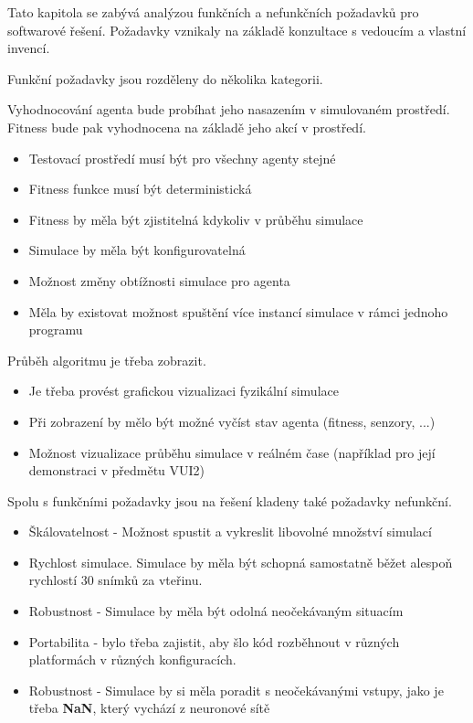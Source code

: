 Tato kapitola se zabývá analýzou funkčních a nefunkčních požadavků pro softwarové řešení. Požadavky vznikaly na základě konzultace s vedoucím a vlastní invencí.

Funkční požadavky jsou rozděleny do několika kategorii.

Vyhodnocování agenta bude probíhat jeho nasazením v simulovaném prostředí. Fitness bude pak vyhodnocena na základě jeho akcí v prostředí.
\begin{itemize}
	\item Testovací prostředí musí být pro všechny agenty stejné
	\item Fitness funkce musí být deterministická
	\item Fitness by měla být zjistitelná kdykoliv v průběhu simulace
	\item Simulace by měla být konfigurovatelná 
	\item Možnost změny obtížnosti simulace pro agenta
	\item Měla by existovat možnost spuštění více instancí simulace v rámci jednoho programu
\end{itemize}
Průběh algoritmu je třeba zobrazit.
\begin{itemize}
	\item Je třeba provést grafickou vizualizaci fyzikální simulace
	\item Při zobrazení by mělo být možné vyčíst stav agenta (fitness, senzory, ...) 
	\item Možnost vizualizace průběhu simulace v reálném čase (například pro její demonstraci v předmětu VUI2)
\end{itemize}

Spolu s funkčními požadavky jsou na řešení kladeny také požadavky nefunkční.
\begin{itemize}
	\item Škálovatelnost - Možnost spustit a vykreslit libovolné množství simulací
	\item Rychlost simulace. Simulace by měla být schopná samostatně běžet alespoň rychlostí 30 snímků za vteřinu.
	\item Robustnost - Simulace by měla být odolná neočekávaným situacím
	\item Portabilita - bylo třeba zajistit, aby šlo kód rozběhnout v různých platformách v různých konfiguracích.
	\item Robustnost - Simulace by si měla poradit s neočekávanými vstupy, jako je třeba \textbf{NaN}, který vychází z neuronové sítě
\end{itemize}

